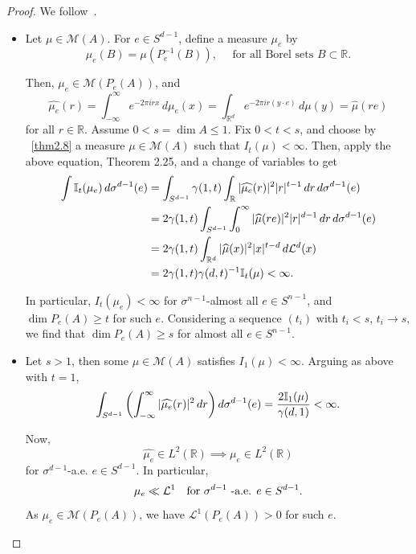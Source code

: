 \documentclass[12pt,a4paper]{report}
\theoremstyle{definition}
\begin{document}
\begin{proof} We follow~\cite{mattila2015fourier}.
\begin{itemize}
    \item [(a)] Let \( \mu \in \mathcal{M}(A) \). For \( e \in S^{d-1} \), define a measure \( \mu_e \) by
$$
\mu_e(B) = \mu(P_e^{-1}(B)), \quad \text{ for all Borel sets } B \subset \mathbb{R}.
$$

Then, \( \mu_e \in \mathcal{M}(P_e(A)) \), and
$$
\widehat{\mu_e}(r) = \int_{-\infty}^\infty e^{-2\pi i r x} \, d\mu_e(x) = \int_{\mathbb{R}^d} e^{-2\pi i r (y \cdot e)} \, d\mu(y) = \widehat{\mu}(re)
$$
for all \( r \in \mathbb{R} \). Assume \( 0 < s = \dim A \le 1 \). Fix \( 0 < t < s \), and choose by ~\ref{thm2.8} a measure \( \mu \in \mathcal{M}(A) \) such that \( I_t(\mu) < \infty \). Then, apply the above equation, Theorem 2.25, and a change of variables to get
\begin{align}
\int \mathbb{I}_t(\mu_e) \, d\sigma^{d-1}(e)
&= \int_{S^{d-1}} \gamma(1, t) \int_{\mathbb{R}} |\widehat{\mu_e}(r)|^2 |r|^{t-1} \, dr \, d\sigma^{d-1}(e) \notag \\
&= 2\gamma(1, t) \int_{S^{d-1}} \int_0^{\infty} |\widehat{\mu}(re)|^2 |r|^{d-1} \, dr \, d\sigma^{d-1}(e)\notag \\
&= 2\gamma(1, t) \int_{\mathbb{R}^d} |\widehat{\mu}(x)|^2 |x|^{t - d} \, d\mathcal{L}^d(x) \notag \\
&= 2\gamma(1, t) \gamma(d, t)^{-1} \mathbb{I}_t(\mu) < \infty.
\notag
\end{align}

In particular, \( I_t(\mu_e) < \infty \) for \( \sigma^{n-1} \)-almost all \( e \in S^{n-1} \), and \( \dim P_e(A) \ge t \) for such \( e \). Considering a sequence \( (t_i) \) with \( t_i < s \), \( t_i \to s \), we find that \( \dim P_e(A) \ge s \) for almost all \( e \in S^{n-1} \).
    \item [(b)] Let \( s > 1 \), then some \( \mu \in \mathcal{M}(A) \) satisfies \( I_1(\mu) < \infty \). Arguing as above with \( t = 1 \),
\begin{equation}
\int_{S^{d-1}} \left( \int_{-\infty}^\infty |\widehat{\mu_e}(r)|^2 \, dr \right) d\sigma^{d-1}(e) = \frac{2\mathbb{I}_1(\mu)}{\gamma(d,1)} < \infty. \notag
\end{equation}

Now, $$ \widehat{\mu_e} \in L^2(\mathbb{R}) \implies \mu_e \in L^2(\mathbb{R}) $$ for \( \sigma^{d-1} \)-a.e. \( e \in S^{d-1} \). In particular,
$$\mu_e \ll
\mathcal{L}^1 \text{\quad for } \sigma^{d-1}\text{ -a.e. } e \in S^{d-1}.$$ As \( \mu_e \in \mathcal{M}(P_e(A)) \), we have \( \mathcal{L}^1(P_e(A)) > 0 \) for such \( e \).
\end{itemize}
\end{proof}
\end{document}
